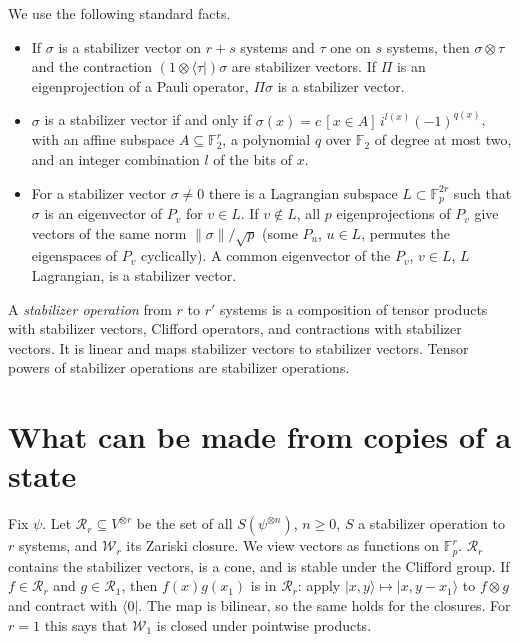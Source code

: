 \documentclass[11pt]{article}
\theoremstyle{definition}
\newcommand{\ket}[1]{|#1\rangle}
\newcommand{\bra}[1]{\langle#1|}
\newcommand{\F}{\mathbb F}
\begin{document}
We use the following standard facts.
\begin{itemize}
\item[(S1)] If $\sigma$ is a stabilizer vector on $r+s$ systems and $\tau$ one on $s$ systems, then $\sigma\otimes\tau$ and the contraction $(1\otimes\bra\tau)\sigma$ are stabilizer vectors. If $\Pi$ is an eigenprojection of a Pauli operator, $\Pi\sigma$ is a stabilizer vector.
\item[(S2)] $\sigma$ is a stabilizer vector if and only if $\sigma(x)=c\,[x\in A]\,i^{l(x)}(-1)^{q(x)}$, with an affine subspace $A\subseteq\F_2^r$, a polynomial $q$ over $\F_2$ of degree at most two, and an integer combination $l$ of the bits of $x$.
\item[(S3)] For a stabilizer vector $\sigma\ne0$ there is a Lagrangian subspace $L\subset\F_p^{2r}$ such that $\sigma$ is an eigenvector of $P_v$ for $v\in L$. If $v\notin L$, all $p$ eigenprojections of $P_v$ give vectors of the same norm $\|\sigma\|/\sqrt p$ (some $P_u$, $u\in L$, permutes the eigenspaces of $P_v$ cyclically). A common eigenvector of the $P_v$, $v\in L$, $L$ Lagrangian, is a stabilizer vector.
\end{itemize}
A \emph{stabilizer operation} from $r$ to $r'$ systems is a composition of tensor products with stabilizer vectors, Clifford operators, and contractions with stabilizer vectors. It is linear and maps stabilizer vectors to stabilizer vectors. Tensor powers of stabilizer operations are stabilizer operations.

\section{What can be made from copies of a state}
Fix $\psi$. Let $\mathcal R_r\subseteq V^{\otimes r}$ be the set of all $S(\psi^{\otimes n})$, $n\ge0$, $S$ a stabilizer operation to $r$ systems, and $\mathcal W_r$ its Zariski closure. We view vectors as functions on $\F_p^r$. $\mathcal R_r$ contains the stabilizer vectors, is a cone, and is stable under the Clifford group.
If $f\in\mathcal R_r$ and $g\in\mathcal R_1$, then $f(x)g(x_1)$ is in $\mathcal R_r$: apply $\ket{x,y}\mapsto\ket{x,y-x_1}$ to $f\otimes g$ and contract with $\bra0$. The map is bilinear, so the same holds for the closures. For $r=1$ this says that $\mathcal W_1$ is closed under pointwise products.
\end{document}
